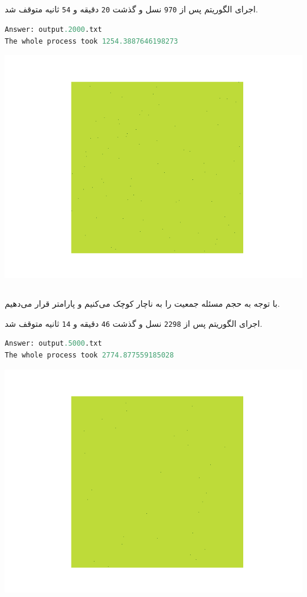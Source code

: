 \documentclass[a4paper, 12pt]{article}
\theoremstyle{definition}
\begin{document}
\subsection{}

اجرای الگوریتم پس از
\texttt{970}
نسل و گذشت
\texttt{20}
دقیقه و
\texttt{54}
ثانیه متوقف شد.

\LTR
\begin{lstlisting}[language=Python]
Answer: output.2000.txt
The whole process took 1254.3887646198273
\end{lstlisting}
\RTL

\begin{center}
    \includegraphics[width=.7\textwidth]{output.2000.png}
\end{center}

\subsection{}

با توجه به حجم مسئله جمعیت را به ناچار کوچک می‌کنیم و پارامتر
قرار می‌دهیم.

اجرای الگوریتم پس از
\texttt{2298}
نسل و گذشت
\texttt{46}
دقیقه و
\texttt{14}
ثانیه متوقف شد.

\LTR
\begin{lstlisting}[language=Python]
Answer: output.5000.txt
The whole process took 2774.877559185028
\end{lstlisting}
\RTL

\begin{center}
    \includegraphics[width=.7\textwidth]{output.5000.png}
\end{center}
\end{document}
